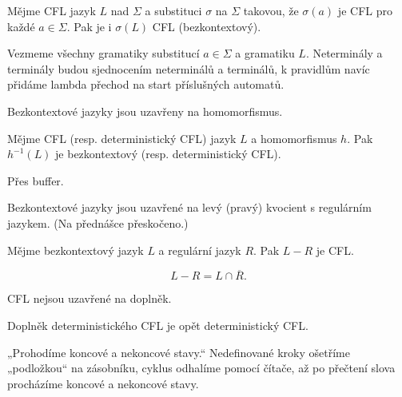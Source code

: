 \documentclass[12pt]{article}                   %
\begin{document}
    \begin{veta}
        Mějme CFL jazyk $L$ nad $\Sigma$ a substituci $\sigma$ na $\Sigma$ takovou, že $\sigma(a)$ je CFL pro každé $a \in \Sigma$. Pak je i $\sigma(L)$ CFL (bezkontextový).

        \begin{dukazin}
            Vezmeme všechny gramatiky substitucí $a \in \Sigma$ a gramatiku $L$. Neterminály a terminály budou sjednocením neterminálů a terminálů, k pravidlům navíc přidáme lambda přechod na start příslušných automatů.
        \end{dukazin}
    \end{veta}

    \begin{dusledek}[Homomorfismus]
        Bezkontextové jazyky jsou uzavřeny na homomorfismus.
    \end{dusledek}

    \begin{veta}
        Mějme CFL (resp. deterministický CFL) jazyk $L$ a homomorfismus $h$. Pak $h^{-1}(L)$ je bezkontextový (resp. deterministický CFL).
        \begin{dukazin}
            Přes buffer.
        \end{dukazin}
    \end{veta}

    \begin{lemma}
        Bezkontextové jazyky jsou uzavřené na levý (pravý) kvocient s regulárním jazykem. (Na přednášce přeskočeno.)
    \end{lemma}

    \begin{veta}
        Mějme bezkontextový jazyk $L$ a regulární jazyk $R$. Pak $L - R$ je CFL.

        \begin{dukazin}
            $$ L - R = L \cap \overline{R}. $$
        \end{dukazin}
    \end{veta}

    \begin{upozorneni}
        CFL nejsou uzavřené na doplněk.
    \end{upozorneni}

    \begin{lemma}
        Doplněk deterministického CFL je opět deterministický CFL.

        \begin{dukazin}
            „Prohodíme koncové a nekoncové stavy.“ Nedefinované kroky ošetříme „podložkou“ na zásobníku, cyklus odhalíme pomocí čítače, až po přečtení slova procházíme koncové a nekoncové stavy.
        \end{dukazin}
    \end{lemma}
\end{document}
